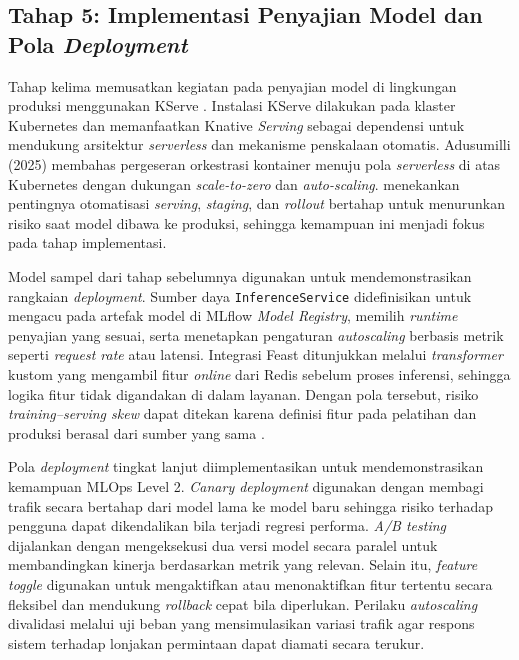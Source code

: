 \subsection{Tahap 5: Implementasi Penyajian Model dan Pola \textit{Deployment}}

Tahap kelima memusatkan kegiatan pada penyajian model di lingkungan produksi menggunakan KServe \parencite{kserve2024}. Instalasi KServe dilakukan pada klaster Kubernetes dan memanfaatkan Knative \textit{Serving} sebagai dependensi untuk mendukung arsitektur \textit{serverless} dan mekanisme penskalaan otomatis. Adusumilli (2025) membahas pergeseran orkestrasi kontainer menuju pola \textit{serverless} di atas Kubernetes dengan dukungan \textit{scale-to-zero} dan \textit{auto-scaling}. \textcite{shankar2022operationalizing} menekankan pentingnya otomatisasi \textit{serving}, \textit{staging}, dan \textit{rollout} bertahap untuk menurunkan risiko saat model dibawa ke produksi, sehingga kemampuan ini menjadi fokus pada tahap implementasi.

Model sampel dari tahap sebelumnya digunakan untuk mendemonstrasikan rangkaian \textit{deployment}. Sumber daya \texttt{InferenceService} didefinisikan untuk mengacu pada artefak model di MLflow \textit{Model Registry}, memilih \textit{runtime} penyajian yang sesuai, serta menetapkan pengaturan \textit{autoscaling} berbasis metrik seperti \textit{request rate} atau latensi. Integrasi Feast ditunjukkan melalui \textit{transformer} kustom yang mengambil fitur \textit{online} dari Redis sebelum proses inferensi, sehingga logika fitur tidak digandakan di dalam layanan. Dengan pola tersebut, risiko \textit{training--serving skew} dapat ditekan karena definisi fitur pada pelatihan dan produksi berasal dari sumber yang sama \parencite{munappy2022data}.

Pola \textit{deployment} tingkat lanjut diimplementasikan untuk mendemonstrasikan kemampuan MLOps Level 2. \textit{Canary deployment} digunakan dengan membagi trafik secara bertahap dari model lama ke model baru sehingga risiko terhadap pengguna dapat dikendalikan bila terjadi regresi performa. \textit{A/B testing} dijalankan dengan mengeksekusi dua versi model secara paralel untuk membandingkan kinerja berdasarkan metrik yang relevan. Selain itu, \textit{feature toggle} digunakan untuk mengaktifkan atau menonaktifkan fitur tertentu secara fleksibel dan mendukung \textit{rollback} cepat bila diperlukan. Perilaku \textit{autoscaling} divalidasi melalui uji beban yang mensimulasikan variasi trafik agar respons sistem terhadap lonjakan permintaan dapat diamati secara terukur.

